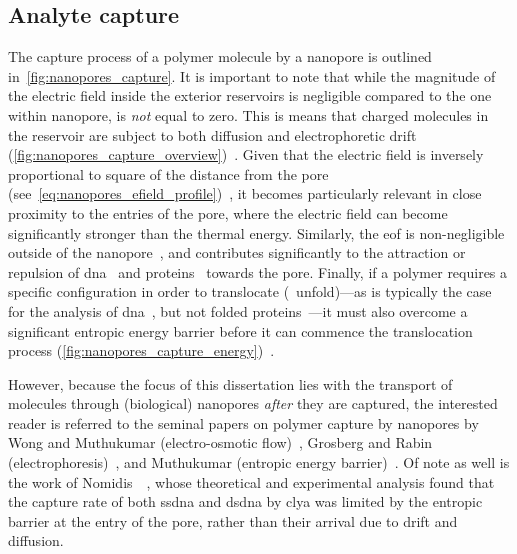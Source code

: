 \subsection{Analyte capture}
%

The capture process of a polymer molecule by a nanopore is outlined in~\cref{fig:nanopores_capture}. It is
important to note that while the magnitude of the electric field inside the exterior reservoirs is negligible
compared to the one within nanopore, is \emph{not} equal to zero. This is means that charged molecules in the
reservoir are subject to both diffusion and electrophoretic drift
(\cref{fig:nanopores_capture_overview})~\cite{Muthukumar-2010}. Given that the electric field is inversely
proportional to square of the distance from the pore
(see~\cref{eq:nanopores_efield_profile})~\cite{Grosberg-2010}, it becomes particularly relevant in close
proximity to the entries of the pore, where the electric field can become significantly stronger than the
thermal energy. Similarly, the \gls{eof} is non-negligible outside of the nanopore~\cite{Wong-2007}, and
contributes significantly to the attraction or repulsion of \gls{dna}~\cite{Firnkes-2010} and
proteins~\cite{Soskine-2012,Soskine-2013} towards the pore. Finally, if a polymer requires a specific
configuration in order to translocate (\ie~unfold)---as is typically the case for the analysis of
\gls{dna}~\cite{Muthukumar-2010}, but not folded proteins~\cite{Yusko-2011,Soskine-2012,Plesa-2013}---it must
also overcome a significant entropic energy barrier before it can commence the translocation process
(\cref{fig:nanopores_capture_energy})~\cite{Muthukumar-2010}.

However, because the focus of this dissertation lies with the transport of molecules through (biological)
nanopores \emph{after} they are captured, the interested reader is referred to the seminal papers on polymer
capture by nanopores by Wong and Muthukumar (electro-osmotic flow)~\cite{Wong-2007}, Grosberg and Rabin
(electrophoresis)~\cite{Grosberg-2010}, and Muthukumar (entropic energy barrier)~\cite{Muthukumar-2010}. Of
note as well is the work of Nomidis~\etal~\cite{Nomidis-2018}, whose theoretical and experimental analysis
found that the capture rate of both \gls{ssdna} and \gls{dsdna} by \gls{clya} was limited by the entropic
barrier at the entry of the pore, rather than their arrival due to drift and diffusion.

